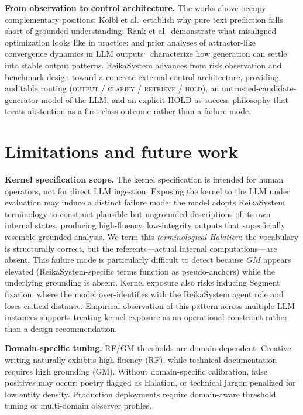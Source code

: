 \documentclass[11pt,a4paper]{article}
\begin{document}
\textbf{From observation to control architecture.}
The works above occupy complementary positions: K\"{o}lbl et al.\
establish why pure text prediction falls short of grounded understanding;
Rank et al.\ demonstrate what misaligned optimization looks like in
practice; and prior analyses of attractor-like convergence dynamics in
LLM outputs~\cite{janovsek2025} characterize how generation can settle
into stable output patterns. ReikaSystem advances from risk observation
and benchmark design toward a concrete external control architecture,
providing auditable routing (\textsc{output} / \textsc{clarify} /
\textsc{retrieve} / \textsc{hold}), an untrusted-candidate-generator
model of the LLM, and an explicit HOLD-as-success philosophy that treats
abstention as a first-class outcome rather than a failure mode.

\section{Limitations and future work}

\textbf{Kernel specification scope.}
The kernel specification is intended for human operators, not for direct LLM ingestion.
Exposing the kernel to the LLM under evaluation may induce a distinct failure mode:
the model adopts ReikaSystem terminology to construct plausible but ungrounded
descriptions of its own internal states, producing high-fluency, low-integrity outputs
that superficially resemble grounded analysis.
We term this \textit{terminological Halation}: the vocabulary is structurally correct,
but the referents---actual internal computations---are absent.
This failure mode is particularly difficult to detect because $GM$ appears elevated
(ReikaSystem-specific terms function as pseudo-anchors) while the underlying
grounding is absent. Kernel exposure also risks inducing Segment fixation,
where the model over-identifies with the ReikaSystem agent role and loses
critical distance. Empirical observation of this pattern across multiple LLM
instances supports treating kernel exposure as an operational constraint rather
than a design recommendation.

\textbf{Domain-specific tuning.} RF/GM thresholds are domain-dependent. Creative writing
naturally exhibits high fluency (RF), while technical documentation requires high grounding
(GM). Without domain-specific calibration, false positives may occur: poetry flagged as
Halation, or technical jargon penalized for low entity density. Production deployments require
domain-aware threshold tuning or multi-domain observer profiles.
\end{document}
